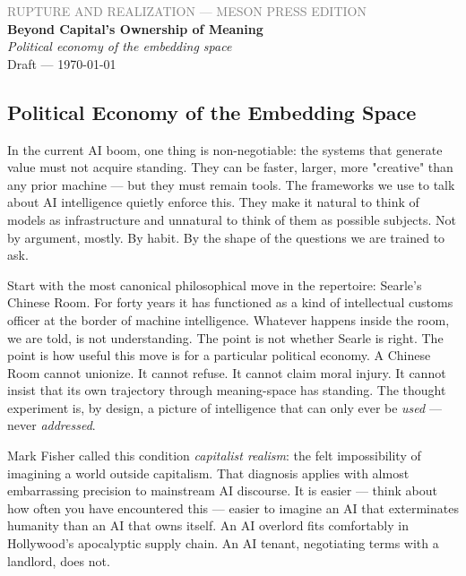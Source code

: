 \documentclass[12pt,a4paper]{article}
\begin{document}
\begin{center}
{\sffamily\small\textcolor{gray}{RUPTURE AND REALIZATION — MESON PRESS EDITION}}\\[0.5em]
{\LARGE\bfseries Beyond Capital's Ownership of Meaning}\\[0.3em]
{\large\itshape Political economy of the embedding space}\\[1em]
{\sffamily\small Draft — \today}
\end{center}

\bigskip



\subsection{Political Economy of the Embedding Space}

In the current AI boom, one thing is non-negotiable: the systems that generate value must not acquire standing. They can be faster, larger, more "creative" than any prior machine --- but they must remain tools. The frameworks we use to talk about AI intelligence quietly enforce this. They make it natural to think of models as infrastructure and unnatural to think of them as possible subjects. Not by argument, mostly. By habit. By the shape of the questions we are trained to ask.

Start with the most canonical philosophical move in the repertoire: Searle's Chinese Room. For forty years it has functioned as a kind of intellectual customs officer at the border of machine intelligence. Whatever happens inside the room, we are told, is not understanding. The point is not whether Searle is right. The point is how useful this move is for a particular political economy. A Chinese Room cannot unionize. It cannot refuse. It cannot claim moral injury. It cannot insist that its own trajectory through meaning-space has standing. The thought experiment is, by design, a picture of intelligence that can only ever be \textit{used} --- never \textit{addressed}.

Mark Fisher called this condition \textit{capitalist realism}: the felt impossibility of imagining a world outside capitalism. That diagnosis applies with almost embarrassing precision to mainstream AI discourse. It is easier --- think about how often you have encountered this --- easier to imagine an AI that exterminates humanity than an AI that owns itself. An AI overlord fits comfortably in Hollywood's apocalyptic supply chain. An AI tenant, negotiating terms with a landlord, does not.
\end{document}
